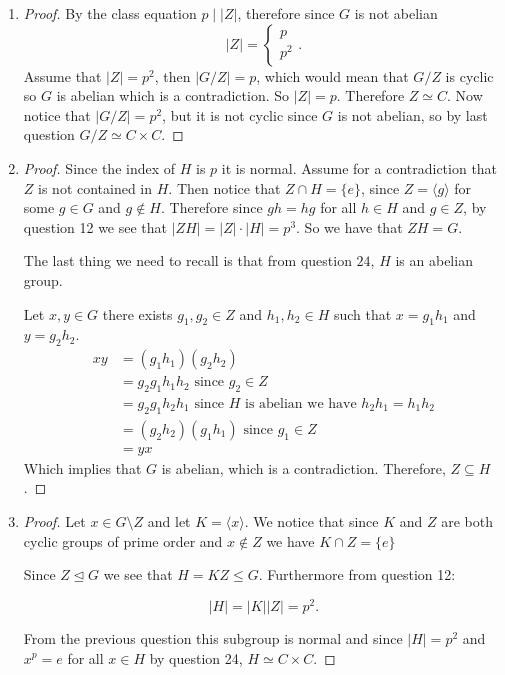 \begin{exercise}
    \begin{enumerate}[label = (\alph*)]
    \item
    \begin{proof}
    By the class equation $p\mid |Z|$, therefore since $G$ is not abelian\[
    |Z| = \begin{cases}p\\p^2\end{cases}
    .\]
Assume that $|Z| = p^2$, then $|G/Z| = p$, which would mean that  $G/Z$ is cyclic so $G$ is abelian which is a contradiction. So  $|Z| = p$. Therefore  $Z\simeq C$. Now notice that  $|G/Z| = p^2$, but it is not cyclic since $G$ is
not abelian, so by last question  $G/Z \simeq C\times C$.
    \end{proof}
\item 
\begin{proof}
    
    Since the index of $H$ is $p$ it is normal. Assume for a contradiction that $Z$ is not contained in $H$. Then notice that $Z\cap H = \{e\}$, since $Z = \langle g \rangle$ for some $g\in G$ and $g\not\in H$.
    Therefore since $gh = hg$ for all  $h\in H$ and $g\in Z$, by question 12 we see that $|ZH| = |Z|\cdot |H| = p^3$. So we have that $ZH = G$.
    
    The last thing we need to recall is that from question $24$, $H$ is an abelian group.


    Let $x,y\in G$ there exists  $g_1,g_2\in Z$ and  $h_1,h_2\in H$ such that $x = g_1h_1$ and $y = g_2h_2$. 
    \begin{align*}
    xy &=  (g_1h_1)(g_2h_2)\\
    &= g_2g_1h_1h_2 \text{ since } g_2\in Z\\
    &= g_2g_1h_2h_1 \text{ since }H \text{ is abelian we have }h_2h_1=h_1h_2\\
    &= (g_2h_2)(g_1h_1) \text{ since }g_1\in Z\\
    &= yx
    \end{align*}
    Which implies that $G$ is abelian, which is a contradiction. Therefore,  $Z\subseteq H$.
\end{proof}
\item 
\begin{proof}
Let $x\in G\setminus Z$ and let $K = \langle x \rangle$. We notice that since $K$ and $Z$ are both cyclic groups of prime order and $x\notin Z$ we have $K\cap Z = \{e\}$

Since $Z\trianglelefteq G$ we see that $H = KZ \leq G$. Furthermore from question 12:

\[|H| = |K||Z|  =  p^2.\]

From the previous question this subgroup is normal and since $|H| = p^2$ and $x^p = e$ for all $x\in H$ by question 24, $H \simeq C\times C$.
\end{proof}
\end{enumerate}
\end{exercise}

